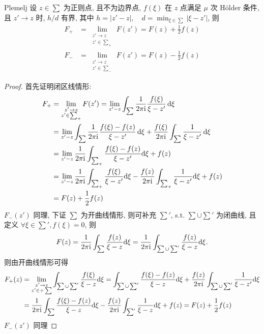\begin{theorem}{Plemelj}
  设 $ z \in \sum $ 为正则点, 且不为边界点, $ f(\xi) $ 在 $ z $ 点满足 $ \mu $ 次 H\"older 条件, 且 $ z' \to z $ 时, $ h/d $ 有界, 其中 $ h = | z' - z|, \quad d = \min_{\xi \in \sum} |\xi - z' | $, 则
  \begin{align}
    F_{+} &= \lim_{\substack{z' \to z \\ z' \in \sum_{+}}} F(z') = F(z) + \frac{1}{2}f(z) \label{eq:Plemelj-1}\\
    F_{-} &= \lim_{\substack{z' \to z \\ z' \in \sum_{-}}} F(z') = F(z) - \frac{1}{2}f(z)\label{eq:Plemelj-2}
  \end{align}
\end{theorem}
\begin{proof}
  首先证明闭区线情形: 
  \begin{equation}
    \begin{aligned}
      F_{+} &= \lim_{\substack{z' \to z \\ z' \in \sum_{+}}} F(z') = \lim_{z' - z} \int_{\sum} \frac{1}{2 \pi \mathrm{i}} \frac{f(\xi)}{\xi - z'} \, \mathrm{d} \xi \\
            &= \lim_{z' - z} \int_{\sum} \frac{1}{2 \pi \mathrm{i}} \frac{f(\xi) - f(z)}{\xi - z'} \, \mathrm{d} \xi + \frac{f(\xi)}{2 \pi \mathrm{i}} \int_{\sum} \frac{1}{\xi - z'} \, \mathrm{d} \xi \\
            &= \lim_{z' - z} \frac{1}{2 \pi \mathrm{i}} \int_{\sum_{+}}  \frac{f(\xi) - f(z)}{\xi - z'}  \mathrm{d} \xi + f(z) \\
            &= \lim_{z' - z} \frac{1}{2 \pi \mathrm{i}} \int_{\sum_{+}}  \frac{f(\xi)}{\xi - z'}  \mathrm{d} \xi - \frac{f(z)}{2 \pi \mathrm{i}} \int_{\sum_{+}}  \frac{1}{\xi - z'}  \mathrm{d} \xi+ f(z) \\
            &= F(z) + \frac{1}{2}f(z)
    \end{aligned}
  \end{equation}
  $ F_{-}(z') $ 同理, 下证 $ \sum $ 为开曲线情形, 则可补充 $ \sum' $, s.t. $ \sum \cup \sum' $ 为闭曲线, 且定义 $ \forall \xi \in \sum', f(\xi) = 0 $, 则
  \begin{equation}
    F(z) = \frac{1}{2 \pi \mathrm{i}} \int_{\sum}  \frac{f(z)}{\xi - z}  \mathrm{d} \xi = \frac{1}{2 \pi \mathrm{i}} \int_{\sum \cup \sum'}  \frac{f(z)}{\xi - z}  \mathrm{d} \xi.
  \end{equation}
  则由开曲线情形可得
  \begin{equation}
    \begin{aligned}
      F_{+}(z) &= \lim_{\substack{z' \to z \\ z' \in +\sum}} \int_{\sum \cup \sum'}  \frac{f(\xi)}{\xi - z}  \mathrm{d} \xi = \int_{\sum \cup \sum'}  \frac{f(\xi) - f(z)}{\xi - z}  \mathrm{d} \xi + \frac{f(z)}{2 \pi \mathrm{i}} \int_{\sum \cup \sum'} \frac{1}{\xi - z'} \mathrm{d} \xi \\
      &= \frac{1}{2 \pi \mathrm{i}} \int_{\sum} \frac{f(\xi) - f(z)}{\xi - z} \mathrm{d} \xi - \frac{f(z)}{2 \pi \mathrm{i}} \int_{\sum'} \frac{1}{\xi - z} \mathrm{d} \xi + f(z) = F(z) + \frac{1}{2}f(z)
    \end{aligned}
  \end{equation}
  $ F_{-}(z') $ 同理
\end{proof}

